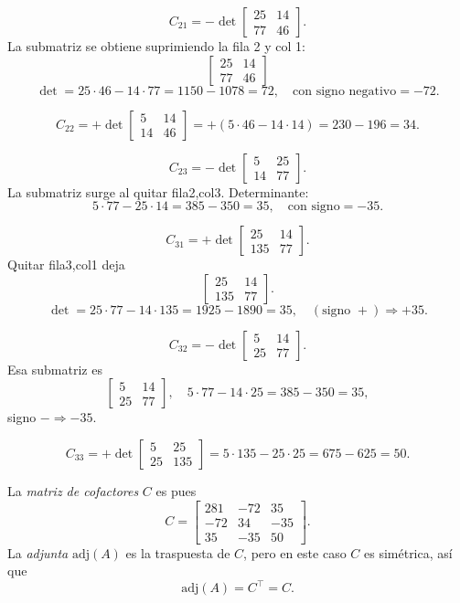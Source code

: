 \documentclass[10pt,a4paper]{article}
\begin{document}
\[
C_{21}
= -\det\begin{bmatrix}25 &14\\77 &46\end{bmatrix}.
\]
La submatriz se obtiene suprimiendo la fila 2 y col 1:
\[
\begin{bmatrix}25 &14\\77 &46\end{bmatrix}
\]
\[
\det=25\cdot46 -14\cdot77=1150-1078=72,
\quad
\text{con signo negativo}=-72.
\]

\[
C_{22}
= +\det\begin{bmatrix}5 &14\\14 &46\end{bmatrix}
= +(5\cdot46 -14\cdot14)=230-196=34.
\]

\[
C_{23}
= -\det\begin{bmatrix}5 &25\\14 &77\end{bmatrix}.
\]
La submatriz surge al quitar fila2,col3. Determinante:
\[
5\cdot77 -25\cdot14=385-350=35,
\quad
\text{con signo}=-35.
\]

\[
C_{31}
= +\det\begin{bmatrix}25 &14\\135 &77\end{bmatrix}.
\]
Quitar fila3,col1 deja
\[
\begin{bmatrix}25 &14\\135 &77\end{bmatrix}.
\]
\[
\det=25\cdot77 -14\cdot135=1925-1890=35,
\quad
(\text{signo }+)\Rightarrow +35.
\]

\[
C_{32}
= -\det\begin{bmatrix}5 &14\\25 &77\end{bmatrix}.
\]
Esa submatriz es
\[
\begin{bmatrix}5 &14\\25 &77\end{bmatrix},
\quad
5\cdot77 -14\cdot25=385-350=35,
\]
signo $- \Rightarrow -35.$

\[
C_{33}
= +\det\begin{bmatrix}5 &25\\25 &135\end{bmatrix}
=5\cdot135 -25\cdot25=675-625=50.
\]

La \emph{matriz de cofactores} $C$ es pues
\[
C
=
\begin{bmatrix}
281 & -72 & 35\\
-72 & 34 & -35\\
35 & -35 & 50
\end{bmatrix}.
\]
La \emph{adjunta} $\mathrm{adj}(A)$ es la traspuesta de $C$, pero en este caso $C$ es simétrica, así que
\[
\mathrm{adj}(A) = C^\top = C.
\]
\end{document}
